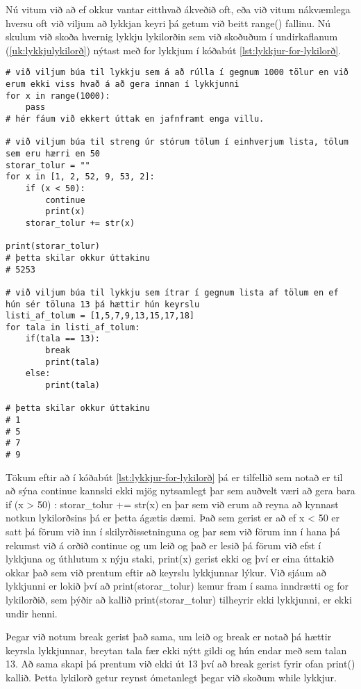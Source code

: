 Nú vitum við að ef okkur vantar eitthvað ákveðið oft, eða við vitum nákvæmlega hversu oft við viljum að lykkjan keyri þá getum við beitt range() fallinu.
Nú skulum við skoða hvernig lykkju lykilorðin sem við skoðuðum í undirkaflanum  (\ref{uk:lykkjulykilorð}) nýtast með for lykkjum í kóðabút \ref{lst:lykkjur-for-lykilorð}.

\begin{lstlisting}[caption=Lykilorðin pass\, continue og break notuð með for lykkju, label=lst:lykkjur-for-lykilorð]
# við viljum búa til lykkju sem á að rúlla í gegnum 1000 tölur en við erum ekki viss hvað á að gera innan í lykkjunni
for x in range(1000):
	pass
# hér fáum við ekkert úttak en jafnframt enga villu.

# við viljum búa til streng úr stórum tölum í einhverjum lista, tölum sem eru hærri en 50
storar_tolur = ""
for x in [1, 2, 52, 9, 53, 2]:
	if (x < 50):
		continue
		print(x)
	storar_tolur += str(x)

print(storar_tolur)
# þetta skilar okkur úttakinu
# 5253

# við viljum búa til lykkju sem ítrar í gegnum lista af tölum en ef hún sér töluna 13 þá hættir hún keyrslu
listi_af_tolum = [1,5,7,9,13,15,17,18]
for tala in listi_af_tolum:
	if(tala == 13):
		break
		print(tala)
	else:
		print(tala)

# þetta skilar okkur úttakinu
# 1
# 5 
# 7
# 9
\end{lstlisting}

Tökum eftir að í kóðabút \ref{lst:lykkjur-for-lykilorð} þá er tilfellið sem notað er til að sýna continue kannski ekki mjög nytsamlegt þar sem auðvelt væri að gera bara if (x > 50) : storar\_tolur += str(x) en þar sem við erum að reyna að kynnast notkun lykilorðsins þá er þetta ágætis dæmi.
Það sem gerist er að ef x < 50 er satt þá förum við inn í skilyrðissetninguna og þar sem við förum inn í hana þá rekumst við á orðið continue og um leið og það er lesið þá förum við efst í lykkjuna og úthlutum x nýju staki, print(x) gerist ekki og því er eina úttakið okkar það sem við prentum eftir að keyrslu lykkjunnar lýkur.
Við sjáum að lykkjunni er lokið því að print(storar\_tolur) kemur fram í sama inndrætti og for lykilorðið, sem þýðir að kallið print(storar\_tolur) tilheyrir ekki lykkjunni, er ekki undir henni.

Þegar við notum break gerist það sama, um leið og break er notað þá hættir keyrsla lykkjunnar, breytan tala fær ekki nýtt gildi og hún endar með sem talan 13.
Að sama skapi þá prentum við ekki út 13 því að break gerist fyrir ofan print() kallið.
Þetta lykilorð getur reynst ómetanlegt þegar við skoðum while lykkjur.

